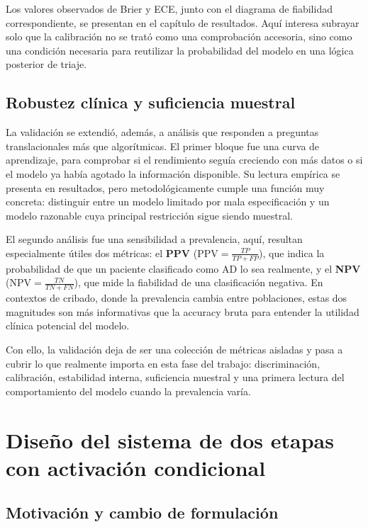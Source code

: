 Los valores observados de Brier y ECE, junto con el diagrama de fiabilidad correspondiente, se presentan en el capítulo
de resultados. Aquí interesa subrayar solo que la calibración no se trató como una comprobación accesoria, sino como una
condición necesaria para reutilizar la probabilidad del modelo en una lógica posterior de triaje.

\subsection{Robustez clínica y suficiencia muestral}

La validación se extendió, además, a análisis que responden a preguntas translacionales más que algorítmicas. El primer
bloque fue una curva de aprendizaje, para comprobar si el rendimiento seguía creciendo con más datos o si el modelo ya
había agotado la información disponible. Su lectura empírica se presenta en resultados, pero metodológicamente cumple
una función muy concreta: distinguir entre un modelo limitado por mala especificación y un modelo razonable cuya
principal restricción sigue siendo muestral.

El segundo análisis fue una sensibilidad a prevalencia, aquí, resultan especialmente útiles dos métricas:
el \textbf{PPV} ($\mathrm{PPV}=\frac{TP}{TP+FP}$), que indica la probabilidad de que un paciente clasificado como AD lo sea realmente,
 y el \textbf{NPV} ($\mathrm{NPV}=\frac{TN}{TN+FN}$), que mide la fiabilidad de una clasificación negativa. En contextos
  de cribado, donde la prevalencia cambia entre poblaciones, estas dos magnitudes son más informativas que la accuracy
  bruta para entender la utilidad clínica potencial del modelo.

Con ello, la validación deja de ser una colección de métricas aisladas y pasa a cubrir lo que realmente importa en esta
fase del trabajo: discriminación, calibración, estabilidad interna, suficiencia muestral y una primera lectura del
comportamiento del modelo cuando la prevalencia varía.

\section{Diseño del sistema de dos etapas con activación condicional}\label{sec:metodo_cascade}

\subsection{Motivación y cambio de formulación}

